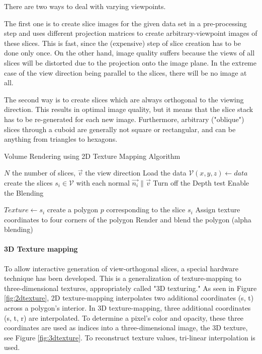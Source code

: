 There are two ways to deal with varying viewpoints.

The first one is to create slice images for the given data set in a pre-processing step and uses different projection matrices to create arbitrary-viewpoint images of these slices. This is fast, since the (expensive) step of slice creation has to be done only once. On the other hand, image quality suffers because the views of all slices will be distorted due to the projection onto the image plane. In the extreme case of the view direction being parallel to the slices, there will be no image at all.

The second way is to create slices which are always orthogonal to the viewing direction. This results in optimal image quality, but it means that the slice stack has to be re-generated for each new image. Furthermore, arbitrary ("oblique") slices through a cuboid are generally not square or rectangular, and can be anything from triangles to hexagons.

\begin{algorithm} \caption{Volume Rendering using 2D Texture Mapping Algorithm} 
\label{alg:tex2dmapping}
\begin{algorithmic}[1]
\Require $N$ the number of slices, $\vec{v} $ the view direction
\State Load the data $\mathcal V(x,y,z) \gets data$ 
\State create the slices $s_i \in \mathcal V$ with each normal $\vec{n_i} \parallel \vec{v}$
\State Turn off the Depth test 
\State Enable the Blending 

\State $Texture \gets s_i$
\State create a polygon $p$ corresponding to the slice $s_i$
\State Assign texture coordinates to four corners of the polygon
\State Render and blend the polygon (alpha blending) 
\EndFor

\end{algorithmic}
\end{algorithm}

\paragraph{3D Texture mapping}
To allow interactive generation of view-orthogonal slices, a special hardware technique has been developed. This is a generalization of texture-mapping to three-dimensional textures, appropriately called "3D texturing."
As seen in Figure \ref{fig:2dtexture}, 2D texture-mapping interpolates two additional coordinates (s, t) across a polygon's interior. In 3D texture-mapping, three additional coordinates (s, t, r) are interpolated. To determine a pixel's color and opacity, these three coordinates are used as indices into a three-dimensional image, the 3D texture, see Figure \ref{fig:3dtexture}. To reconstruct texture values, tri-linear interpolation is used.

